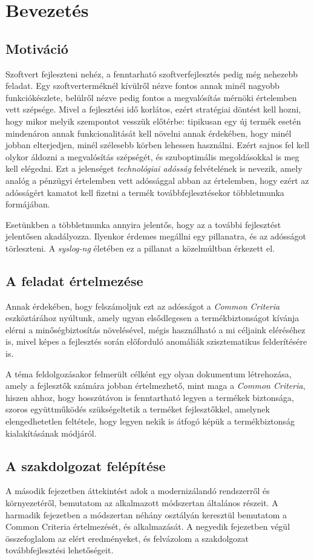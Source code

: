 \chapter{Bevezetés}

\section{Motiváció}

Szoftvert fejleszteni nehéz, a fenntarható szoftverfejlesztés pedig még nehezebb feladat.
Egy szoftverterméknél kívülről nézve fontos annak minél nagyobb funkciókészlete, belülről nézve
pedig fontos a megvalósítás mérnöki értelemben vett szépsége.
Mivel a fejlesztési idő korlátos, ezért stratégiai döntést kell hozni, hogy mikor melyik szempontot
vesszük előtérbe: tipikusan egy új termék esetén mindenáron annak funkcionalitását kell növelni
annak érdekében, hogy minél jobban elterjedjen, minél szélesebb körben lehessen használni.  Ezért
sajnos fel kell olykor áldozni a megvalósítás szépségét, és szuboptimális megoldásokkal is meg kell
elégedni. Ezt a jelenséget \emph{technológiai adósság}\cite{magnusson2014technology} felvételének is
nevezik, amely analóg a pénzügyi értelemben vett adóssággal abban az értelemben, hogy ezért az
adósságért kamatot kell fizetni a termék továbbfejlesztésekor többletmunka formájában.

Esetünkben a többletmunka annyira jelentős, hogy az a további fejlesztést jelentősen akadályozza.
Ilyenkor érdemes megállni egy pillanatra, és az adósságot törleszteni. A \mbox{\emph{syslog-ng}}
életében ez a pillanat a közelmúltban érkezett el.

\section{A feladat értelmezése}
Annak érdekében, hogy felszámoljuk ezt az adósságot a \emph{Common Criteria} eszköztárához nyúltunk,
amely ugyan elsődlegesen a termékbiztonságot kívánja elérni a minőségbiztosítás növelésével,
mégis használható a mi céljaink eléréséhez is, mivel képes a fejlesztés során előforduló anomáliák
szisztematikus felderítésére is.

A téma feldolgozásakor felmerült célként egy olyan dokumentum létrehozása, amely a fejlesztők
számára jobban értelmezhető, mint maga a \emph{Common Criteria}, hiszen ahhoz, hogy hosszútávon is
fenntartható legyen a termékek biztonsága, szoros együttműködés szükségeltetik a terméket
fejlesztőkkel, amelynek elengedhetetlen feltétele, hogy legyen nekik is átfogó képük
a termékbiztonság kialakításának módjáról.

\section{A szakdolgozat felépítése}
A második fejezetben áttekintést adok a modernizálandó rendszerről és környezetéről, bemutatom az
alkalmazott módszertan általános részeit. A harmadik fejezetben a módszertan néhány osztályán
keresztül bemutatom a Common Criteria értelmezését, és alkalmazását. A negyedik fejezetben végül
összefoglalom az elért eredményeket, és felvázolom a szakdolgozat továbbfejlesztési lehetőségeit.
